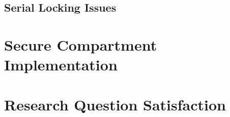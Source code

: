 \subsection{Serial Locking Issues}


\section{Secure Compartment Implementation}


\section{Research Question Satisfaction}

